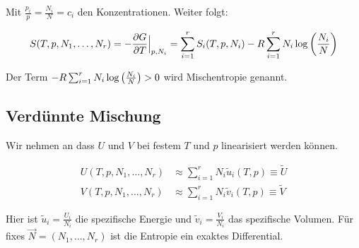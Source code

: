 Mit $\frac{p_i}{p} = \frac{N_i}{N} = c_i$ den Konzentrationen.
Weiter folgt:

\vspace{-5pt}

\begin{align*}
    S(T,p,N_1,\dots,N_r) = - \frac{\partial G}{\partial T} \Big|_{p,N_i}
    = \sum_{i=1}^r S_i(T,p,N_i) - R \sum_{i=1}^r N_i \log \left( \frac{N_i}{N} \right)
\end{align*}

\vspace{-2pt}

Der Term $- R \sum_{i=1}^r N_i \log \left( \frac{N_i}{N} \right) > 0$ wird
Mischentropie genannt.

\vspace{-3pt}

\subsection{Verdünnte Mischung}

Wir nehmen
an dass $U$ und $V$ bei festem $T$ und $p$ linearisiert werden können.

\vspace{-10pt}

\begin{align*}
    U(T,p,N_1,\dots,N_r)
    &\approx \sum_{i=1}^r N_i \tilde{u}_i (T,p) \equiv \tilde{U}
    \\
    V(T,p,N_1,\dots,N_r) &\approx \sum_{i=1}^r N_i \tilde{v}_i (T,p) \equiv \tilde{V}
\end{align*}

\vspace{-3pt}

Hier ist $\tilde{u}_i = \frac{U_i}{N_i}$ die spezifische Energie und $\tilde{v}_i
= \frac{V_i}{N_i}$ das spezifische Volumen.
Für fixes $\vec{N} = (N_1,\dots,N_r)$ ist die Entropie ein exaktes Differential.

